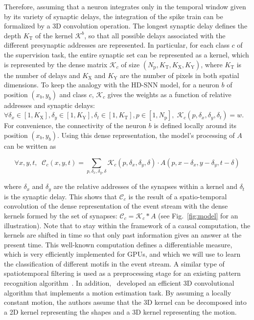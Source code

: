 \documentclass[default]{sn-jnl}%
\theoremstyle{thmstyleone}%
\theoremstyle{thmstyletwo}%
\theoremstyle{thmstylethree}%
\newcommand{\seeFig}[1]{see Fig.~\ref{fig:#1}}%
\newcommand{\postsynaddr}{b} %
\newcommand{\Npol}{N_\text{p}} %
\newcommand{\synapticweight}{w} %
\newcommand{\synapticdelay}{\delta} %
\newcommand{\timev}{t} %
\newcommand{\polev}{p} %
\newcommand{\kernel}{\mathcal{K}} %
\newcommand{\Kx}{K_\text{X}}
\newcommand{\Ky}{K_\text{Y}}
\newcommand{\Ktime}{K_\text{T}}
\newcommand{\class}{c} %
\begin{document}
Therefore, assuming that a neuron integrates only in the temporal window given by its variety of synaptic delays, the integration of the spike train can be formalized by a 3D convolution operation. The longest synaptic delay defines the depth $\Ktime$ of the kernel $\kernel^\postsynaddr$, so that all possible delays associated with the different presynaptic addresses are represented. In particular, for each class $\class$ of the supervision task, the entire synaptic set can be represented as a kernel, which is represented by the dense matrix $\kernel_\class$ of size $(\Npol, \Ktime, \Kx, \Ky)$, where $\Ktime$ is the number of delays and $\Kx$ and $\Ky$ are the number of pixels in both spatial dimensions. To keep the analogy with the HD-SNN model, for a neuron $\postsynaddr$ of position $(x_\postsynaddr, y_\postsynaddr)$ and class $\class$, $\kernel_\class$ gives the weights as a function of relative addresses and synaptic delays: $\forall {\delta_x \in [1, \Kx], \delta_y \in [1, \Ky], \delta_\timev \in [1, \Ktime], \polev \in [1, \Npol]}, \; \kernel_\class(\polev, \delta_x, \delta_y, \synapticdelay_\timev) = \synapticweight$. For convenience, the connectivity of the neuron $\postsynaddr$ is defined locally around its position $(x_\postsynaddr, y_\postsynaddr)$. Using this dense representation, the model's processing of $A$ can be written as %
%
\begin{linenomath*}
\begin{equation}\label{eq:kernel_b}
\forall x, y, \timev, \; \;
\mathcal{C}_\class(x, y, \timev)
= \sum_{p, \delta_x, \delta_y, \synapticdelay} \kernel_\class(p, \delta_x, \delta_y, \synapticdelay) \cdot A(p, x - \delta_x, y - \delta_y, \timev-\synapticdelay)
\end{equation}
\end{linenomath*}
%
where $\delta_x$ and $\delta_y$ are the relative addresses of the synapses within a kernel and $\delta_\timev$ is the synaptic delay. 
This shows that $\mathcal{C}_\class$ is the result of a spatio-temporal convolution of the dense representation of the event stream with the dense kernels formed by the set of synapses: $\mathcal{C}_\class = \kernel_\class \ast A$ (\seeFig{model} for an illustration). Note that to stay within the framework of a causal computation, the kernels are shifted in time so that only past information gives an answer at the present time. This well-known computation defines a differentiable measure, which is very efficiently implemented for GPUs, and which we will use to learn the classification of different motifs in the event stream. A similar type of spatiotemporal filtering is used as a preprocessing stage for an existing pattern recognition algorithm~\citep{ghosh_spatiotemporal_2019}. In addition,~\citep{sekikawa_constant_2018} developed an efficient 3D convolutional algorithm that implements a motion estimation task. By assuming a locally constant motion, the authors assume that the 3D kernel can be decomposed into a 2D kernel representing the shapes and a 3D kernel representing the motion.
\end{document}
